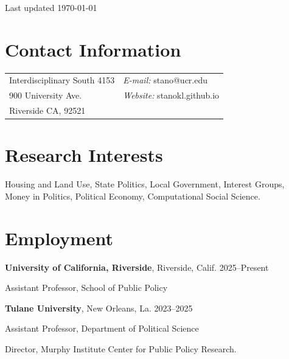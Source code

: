 \documentclass[margin,line]{res}
\newenvironment{list1}{
  \begin{list}{\ding{113}}{%
      \setlength{\itemsep}{0in}
      \setlength{\parsep}{0in} \setlength{\parskip}{0in}
      \setlength{\topsep}{0in} \setlength{\partopsep}{0in} 
      \setlength{\leftmargin}{0.17in}}}{\end{list}}
\begin{document}

\begin{flushright}
Last updated \today
\end{flushright}

\begin{resume}

\section{\sc Contact Information}
\vspace{.05in}
\begin{tabular}{@{}p{2in}p{4in}}

Interdisciplinary South 4153 & {\it E-mail:} stano@ucr.edu \\
900 University Ave.&  {\it Website:} stanokl.github.io \\           
Riverside CA, 92521 &

\end{tabular}


\section{\sc Research Interests}
\vspace{.05in}
Housing and Land Use, State Politics, Local Government, Interest Groups, Money in Politics, Political Economy, Computational Social Science.


\section{\sc Employment}

{\bf University of California, Riverside}, Riverside, Calif. \hfill 2025--Present\\
\vspace*{-.1in}
\begin{list1}
\item[] Assistant Professor, School of Public Policy 
\vspace*{.05in}
\end{list1}


{\bf Tulane University}, New Orleans, La. \hfill 2023--2025\\
\vspace*{-.1in}
\begin{list1}
\item[] Assistant Professor, Department of Political Science
\item[] Director, Murphy Institute Center for Public Policy Research. 
\vspace*{.05in}
\end{list1}




\end{resume}
\end{document}

